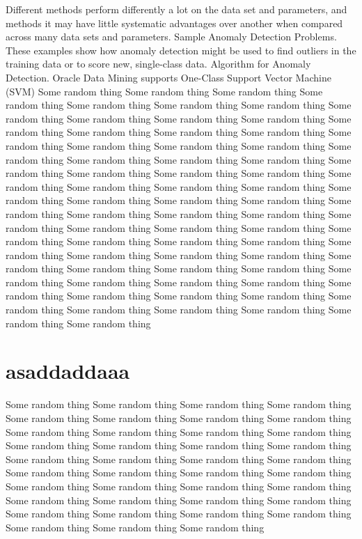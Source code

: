 Different methods perform differently  a lot on the data set and parameters, and methods it may have little systematic advantages over another when compared across many data sets and parameters.
Sample Anomaly Detection Problems. These examples show how anomaly detection might be used to find outliers in the training data or to score new, single-class data.
Algorithm for Anomaly Detection. Oracle Data Mining supports One-Class Support Vector Machine (SVM) Some random thing Some random thing Some random thing Some random thing Some random thing Some random thing Some random thing Some random thing Some random thing Some random thing Some random thing Some random thing Some random thing Some random thing Some random thing Some random thing Some random thing Some random thing Some random thing Some random thing Some random thing Some random thing Some random thing  \cite{CHEN20052617}Some random thing Some random thing Some random thing Some random thing Some random thing Some random thing Some random thing Some random thing Some random thing Some random thing Some random thing Some random thing Some random thing Some random thing Some random thing Some random thing Some random thing Some random thing Some random thing Some random thing Some random thing Some random thing Some random thing  \cite{capgemini1} Some random thing Some random thing Some random thing Some random thing Some random thing Some random thing Some random thing Some random thing Some random thing Some random thing Some random thing Some random thing Some random thing Some random thing Some random thing Some random thing Some random thing Some random thing Some random thing Some random thing Some random thing Some random thing Some random thing  

\section{asaddaddaaa}
Some random thing Some random thing Some random thing Some random thing Some random thing Some random thing Some random thing Some random thing Some random thing Some random thing Some random thing Some random thing Some random thing Some random thing Some random thing Some random thing Some random thing Some random thing Some random thing Some random thing Some random thing Some random thing Some random thing Some random thing Some random thing Some random thing Some random thing Some random thing Some random thing Some random thing Some random thing Some random thing Some random thing Some random thing Some random thing Some random thing Some random thing Some random thing Some random thing  \newline

